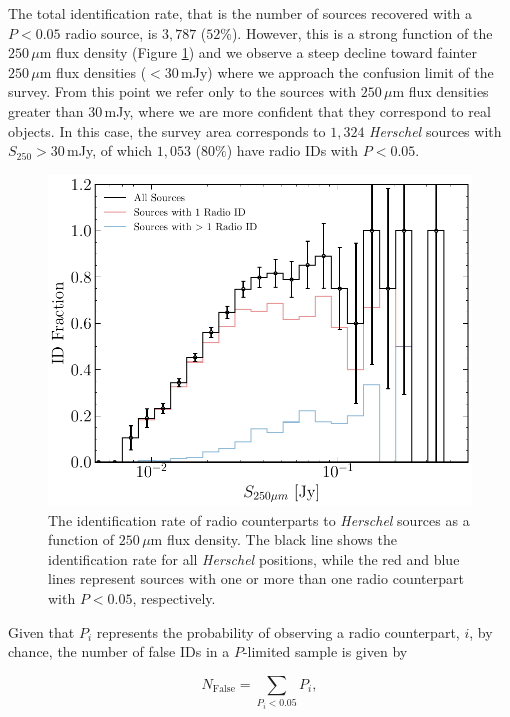 The total identification rate, that is the number of sources recovered with a $P < 0.05$ radio source, is $3,787$ ($52\%$). However, this is a strong function of the $250\,\mu$m flux density (Figure \ref{fig:id_rate}) and we observe a steep decline toward fainter $250\,\mu$m flux densities ($< 30\,$mJy) where we approach the confusion limit of the survey. From this point we refer only to the sources with $250\,\mu$m flux densities greater than 30\,mJy, where we are more confident that they correspond to real objects. In this case, the survey area corresponds to $1,324$ \textit{Herschel} sources with $S_{250} > 30\,$mJy, of which $1,053$ ($80\%$) have radio IDs with $P < 0.05$.

\begin{figure}
	\centering
	\includegraphics[width=0.79\columnwidth]{Figures/Figure_5_4.pdf}
	\caption[Identification rate of radio counterparts to \textit{Herschel} sources]{The identification rate of radio counterparts to \textit{Herschel} sources as a function of $250\,\mu$m flux density. The black line shows the identification rate for all \textit{Herschel} positions, while the red and blue lines represent sources with one or more than one radio counterpart with $P < 0.05$, respectively.}
	\label{fig:id_rate}
\end{figure}

Given that $P_i$ represents the probability of observing a radio counterpart, $i$, by chance, the number of false IDs in a $P$-limited sample is given by

\begin{equation}
    N_{\textrm{False}} = \sum_{P_i < 0.05} P_i,
    \label{eq:false_radio_ids}
\end{equation}

